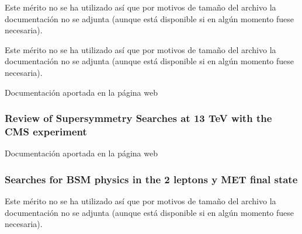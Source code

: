 \documentclass[a4paper, 11pt, twoside, openright]{report}
\begin{document}

Este mérito no se ha utilizado así que por motivos de tamaño del archivo la documentación no se adjunta (aunque está disponible si en algún momento fuese necesaria).


Este mérito no se ha utilizado así que por motivos de tamaño del archivo la documentación no se adjunta (aunque está disponible si en algún momento fuese necesaria).


%
Documentación aportada en la página web

\subsubsection{Review of Supersymmetry Searches at 13 TeV with the CMS experiment}
%
Documentación aportada en la página web

\subsubsection{Searches for BSM physics in the 2 leptons y MET final state}
%
Este mérito no se ha utilizado así que por motivos de tamaño del archivo la documentación no se adjunta (aunque está disponible si en algún momento fuese necesaria).
\end{document}
